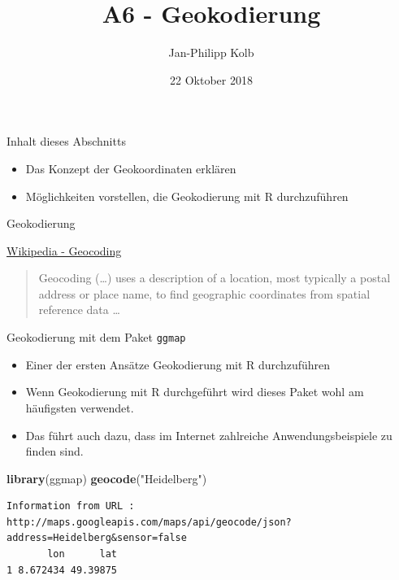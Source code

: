 \documentclass[ignorenonframetext,]{beamer}
\title{A6 - Geokodierung}
\author{Jan-Philipp Kolb}
\date{22 Oktober 2018}
\newenvironment{Shaded}{\begin{snugshade}}{\end{snugshade}}
\newcommand{\KeywordTok}[1]{\textcolor[rgb]{0.13,0.29,0.53}{\textbf{#1}}}
\newcommand{\StringTok}[1]{\textcolor[rgb]{0.31,0.60,0.02}{#1}}
\newcommand{\NormalTok}[1]{#1}
\providecommand{\tightlist}{%
  \setlength{\itemsep}{0pt}\setlength{\parskip}{0pt}}
\begin{document}
\frame{\titlepage}

\begin{frame}{Inhalt dieses Abschnitts}

\begin{itemize}
\tightlist
\item
  Das Konzept der Geokoordinaten erklären
\item
  Möglichkeiten vorstellen, die Geokodierung mit R durchzuführen
\end{itemize}

\end{frame}

\begin{frame}{Geokodierung}

\begin{block}{\href{https://github.com/adam-p/markdown-here/wiki/Markdown-Cheatsheet\#blockquotes}{Wikipedia
- Geocoding}}

\begin{quote}
Geocoding (\ldots{}) uses a description of a location, most typically a
postal address or place name, to find geographic coordinates from
spatial reference data \ldots{}
\end{quote}

\end{block}

\end{frame}

\begin{frame}[fragile]{Geokodierung mit dem Paket \texttt{ggmap}}

\begin{itemize}
\tightlist
\item
  Einer der ersten Ansätze Geokodierung mit R durchzuführen
\item
  Wenn Geokodierung mit R durchgeführt wird dieses Paket wohl am
  häufigsten verwendet.
\item
  Das führt auch dazu, dass im Internet zahlreiche Anwendungsbeispiele
  zu finden sind.
\end{itemize}

\begin{Shaded}
\begin{Highlighting}[]
\KeywordTok{library}\NormalTok{(ggmap)}
\KeywordTok{geocode}\NormalTok{(}\StringTok{"Heidelberg"}\NormalTok{)}
\end{Highlighting}
\end{Shaded}

\begin{verbatim}
Information from URL : http://maps.googleapis.com/maps/api/geocode/json?address=Heidelberg&sensor=false
       lon      lat
1 8.672434 49.39875
\end{verbatim}

\end{frame}
\end{document}
